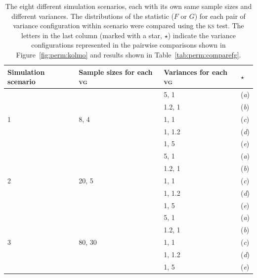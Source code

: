 \begin{table}[!p]
\caption[Summary of simulation scenarios.]{The eight different simulation scenarios, each with its own same sample sizes and different variances. The distributions of the statistic ($F$ or $G$) for each pair of variance configuration within scenario were compared using the \textsc{ks} test. The letters in the last column (marked with a star, $\star$) indicate the variance configurations represented in the pairwise comparisons shown in Figure~\ref{fig:perm:kolmo} and results shown in Table~\ref{tab:perm:comparefg}.}
\begin{center}
{\small
\begin{tabular}{@{}m{20mm}<{\raggedright}m{28mm}<{\raggedright}m{23mm}<{\raggedright}m{10mm}<{\centering}@{}}
\toprule
Simulation scenario & Sample sizes for each \textsc{vg} & Variances for each \textsc{vg} & $\star$\\
\midrule
\multirow{5}{*}{1} & \multirow{5}{*}{8, 4}   & 5, 1   & (\emph{a}) \\
{}                 & {}                      & 1.2, 1 & (\emph{b}) \\
{}                 & {}                      & 1, 1   & (\emph{c}) \\
{}                 & {}                      & 1, 1.2 & (\emph{d}) \\
{}                 & {}                      & 1, 5   & (\emph{e}) \\
\midrule
\multirow{5}{*}{2} & \multirow{5}{*}{20, 5}  & 5, 1   & (\emph{a}) \\
{}                 & {}                      & 1.2, 1 & (\emph{b}) \\
{}                 & {}                      & 1, 1   & (\emph{c}) \\
{}                 & {}                      & 1, 1.2 & (\emph{d}) \\
{}                 & {}                      & 1, 5   & (\emph{e}) \\
\midrule
\multirow{5}{*}{3} & \multirow{5}{*}{80, 30} & 5, 1   & (\emph{a}) \\
{}                 & {}                      & 1.2, 1 & (\emph{b}) \\
{}                 & {}                      & 1, 1   & (\emph{c}) \\
{}                 & {}                      & 1, 1.2 & (\emph{d}) \\
{}                 & {}                      & 1, 5   & (\emph{e}) \\

\end{tabular}}
\end{center}
\end{table}
